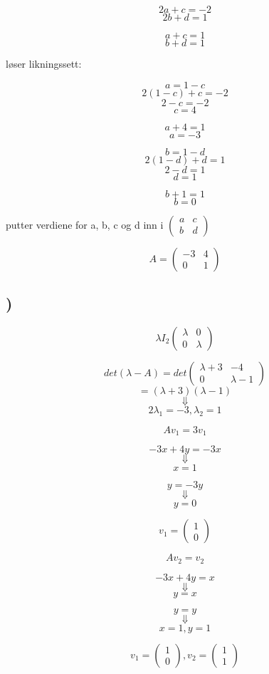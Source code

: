 \documentclass[a4paper,10pt,norsk]{article}
\begin{document}
\[2a + c = -2\]
\[2b + d = 1\]

\[a + c = 1\]
\[b + d = 1\]

løser likningssett:

\[a = 1 - c\]
\[2(1-c) + c = -2\]
\[2 - c = -2\]
\[c = 4\]

\[a + 4 = 1\]
\[a = -3\]

\[b = 1 - d\]
\[2(1 - d) + d = 1\]
\[2 - d = 1\]
\[d = 1\]

\[b + 1 = 1\]
\[b = 0\]

putter verdiene for a, b, c og d inn i $\left(\begin{matrix}a&c\\b&d\end{matrix}\right)$

\[A = \left(\begin{matrix}-3&4\\0&1\end{matrix}\right)\]

\subsection{)}



\[\lambda I_{2} \left(\begin{matrix}\lambda&0\\0&\lambda\end{matrix}\right)\]
 
\[det(\lambda - A) = det\left(\begin{matrix}\lambda + 3&-4\\0&\lambda - 1\end{matrix}\right)\]
\[ = (\lambda + 3)(\lambda - 1) \]
\[\Downarrow\]
\[2 \lambda_{1} = -3, \lambda_{2} = 1\]

\[Av_{1} = 3v_{1}\]

\[-3x + 4y = -3x\] 
\[\Downarrow\]
\[x = 1\]

\[y = -3y\]
\[\Downarrow\]
\[y = 0\]

\[v_{1} = \left(\begin{matrix} 1\\0 \end{matrix}\right)\]

\[Av_{2} = v_{2}\]

\[-3x+4y = x\]
\[\Downarrow\]
\[y = x\]

\[y = y\]
\[\Downarrow\]
\[x = 1, y = 1\]

\[v_{1} = \left(\begin{matrix} 1\\0 \end{matrix}\right), v_{2} = \left(\begin{matrix} 1\\1 \end{matrix}\right)\]
\end{document}
